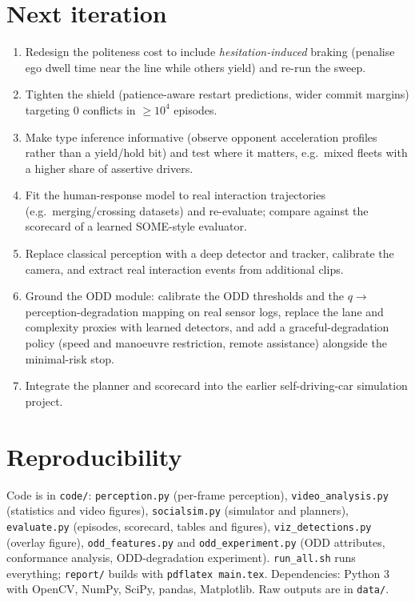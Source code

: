 \documentclass[11pt,a4paper]{article}
\begin{document}
\section{Next iteration}\label{sec:next}
\begin{enumerate}\setlength\itemsep{1pt}
\item Redesign the politeness cost to include \emph{hesitation-induced} braking (penalise ego dwell time near the line while others yield) and re-run the sweep.
\item Tighten the shield (patience-aware restart predictions, wider commit margins) targeting 0 conflicts in $\ge10^4$ episodes.
\item Make type inference informative (observe opponent acceleration profiles rather than a yield/hold bit) and test where it matters, e.g.\ mixed fleets with a higher share of assertive drivers.
\item Fit the human-response model to real interaction trajectories (e.g.\ merging/crossing datasets) and re-evaluate; compare against the scorecard of a learned SOME-style evaluator.
\item Replace classical perception with a deep detector and tracker, calibrate the camera, and extract real interaction events from additional clips.
\item Ground the ODD module: calibrate the ODD thresholds and the $q\to$ perception-degradation mapping on real sensor logs, replace the lane and complexity proxies with learned detectors, and add a graceful-degradation policy (speed and manoeuvre restriction, remote assistance) alongside the minimal-risk stop.
\item Integrate the planner and scorecard into the earlier self-driving-car simulation project.
\end{enumerate}

\section{Reproducibility}
Code is in \texttt{code/}: \texttt{perception.py} (per-frame perception), \texttt{video\_analysis.py} (statistics and video figures), \texttt{socialsim.py} (simulator and planners), \texttt{evaluate.py} (episodes, scorecard, tables and figures), \texttt{viz\_detections.py} (overlay figure), \texttt{odd\_features.py} and \texttt{odd\_experiment.py} (ODD attributes, conformance analysis, ODD-degradation experiment). \texttt{run\_all.sh} runs everything; \texttt{report/} builds with \texttt{pdflatex main.tex}. Dependencies: Python 3 with OpenCV, NumPy, SciPy, pandas, Matplotlib. Raw outputs are in \texttt{data/}.
\end{document}
